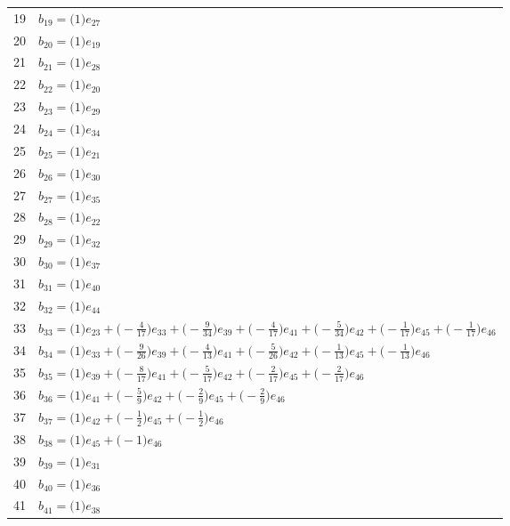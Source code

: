 \begin{longtable}{@{}rP{.82\linewidth}@{}}
19 & $b_{19}=\bigl(1\bigr)e_{27}$\\
20 & $b_{20}=\bigl(1\bigr)e_{19}$\\
21 & $b_{21}=\bigl(1\bigr)e_{28}$\\
22 & $b_{22}=\bigl(1\bigr)e_{20}$\\
23 & $b_{23}=\bigl(1\bigr)e_{29}$\\
24 & $b_{24}=\bigl(1\bigr)e_{34}$\\
25 & $b_{25}=\bigl(1\bigr)e_{21}$\\
26 & $b_{26}=\bigl(1\bigr)e_{30}$\\
27 & $b_{27}=\bigl(1\bigr)e_{35}$\\
28 & $b_{28}=\bigl(1\bigr)e_{22}$\\
29 & $b_{29}=\bigl(1\bigr)e_{32}$\\
30 & $b_{30}=\bigl(1\bigr)e_{37}$\\
31 & $b_{31}=\bigl(1\bigr)e_{40}$\\
32 & $b_{32}=\bigl(1\bigr)e_{44}$\\
33 & $b_{33}=\bigl(1\bigr)e_{23}+\allowbreak \bigl(-\frac{4}{17}\bigr)e_{33}+\allowbreak \bigl(-\frac{9}{34}\bigr)e_{39}+\allowbreak \bigl(-\frac{4}{17}\bigr)e_{41}+\allowbreak \bigl(-\frac{5}{34}\bigr)e_{42}+\allowbreak \bigl(-\frac{1}{17}\bigr)e_{45}+\allowbreak \bigl(-\frac{1}{17}\bigr)e_{46}$\\
34 & $b_{34}=\bigl(1\bigr)e_{33}+\allowbreak \bigl(-\frac{9}{26}\bigr)e_{39}+\allowbreak \bigl(-\frac{4}{13}\bigr)e_{41}+\allowbreak \bigl(-\frac{5}{26}\bigr)e_{42}+\allowbreak \bigl(-\frac{1}{13}\bigr)e_{45}+\allowbreak \bigl(-\frac{1}{13}\bigr)e_{46}$\\
35 & $b_{35}=\bigl(1\bigr)e_{39}+\allowbreak \bigl(-\frac{8}{17}\bigr)e_{41}+\allowbreak \bigl(-\frac{5}{17}\bigr)e_{42}+\allowbreak \bigl(-\frac{2}{17}\bigr)e_{45}+\allowbreak \bigl(-\frac{2}{17}\bigr)e_{46}$\\
36 & $b_{36}=\bigl(1\bigr)e_{41}+\allowbreak \bigl(-\frac{5}{9}\bigr)e_{42}+\allowbreak \bigl(-\frac{2}{9}\bigr)e_{45}+\allowbreak \bigl(-\frac{2}{9}\bigr)e_{46}$\\
37 & $b_{37}=\bigl(1\bigr)e_{42}+\allowbreak \bigl(-\frac{1}{2}\bigr)e_{45}+\allowbreak \bigl(-\frac{1}{2}\bigr)e_{46}$\\
38 & $b_{38}=\bigl(1\bigr)e_{45}+\allowbreak \bigl(-1\bigr)e_{46}$\\
39 & $b_{39}=\bigl(1\bigr)e_{31}$\\
40 & $b_{40}=\bigl(1\bigr)e_{36}$\\
41 & $b_{41}=\bigl(1\bigr)e_{38}$\\

\end{longtable}
